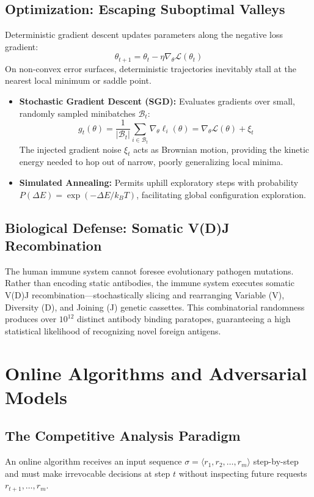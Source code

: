 \documentclass[11pt,a4paper]{article}
\begin{document}
\subsection{Optimization: Escaping Suboptimal Valleys}
Deterministic gradient descent updates parameters along the negative loss gradient:
\begin{equation}
\theta_{t+1} = \theta_t - \eta \nabla_\theta \mathcal{L}(\theta_t)
\end{equation}
On non-convex error surfaces, deterministic trajectories inevitably stall at the nearest local minimum or saddle point.
\begin{itemize}
    \item \textbf{Stochastic Gradient Descent (SGD):} Evaluates gradients over small, randomly sampled minibatches $\mathcal{B}_t$:
    \begin{equation}
    g_t(\theta) = \frac{1}{|\mathcal{B}_t|} \sum_{i \in \mathcal{B}_t} \nabla_\theta \ell_i(\theta) = \nabla_\theta \mathcal{L}(\theta) + \xi_t
    \end{equation}
    The injected gradient noise $\xi_t$ acts as Brownian motion, providing the kinetic energy needed to hop out of narrow, poorly generalizing local minima.
    \item \textbf{Simulated Annealing:} Permits uphill exploratory steps with probability $P(\Delta E) = \exp(-\Delta E / k_B T)$, facilitating global configuration exploration.
\end{itemize}

\subsection{Biological Defense: Somatic V(D)J Recombination}
The human immune system cannot foresee evolutionary pathogen mutations. Rather than encoding static antibodies, the immune system executes somatic V(D)J recombination---stochastically slicing and rearranging Variable (V), Diversity (D), and Joining (J) genetic cassettes. This combinatorial randomness produces over $10^{12}$ distinct antibody binding paratopes, guaranteeing a high statistical likelihood of recognizing novel foreign antigens.

\section{Online Algorithms and Adversarial Models}

\subsection{The Competitive Analysis Paradigm}
An online algorithm receives an input sequence $\sigma = \langle r_1, r_2, \dots, r_m \rangle$ step-by-step and must make irrevocable decisions at step $t$ without inspecting future requests $r_{t+1}, \dots, r_m$.
\end{document}

